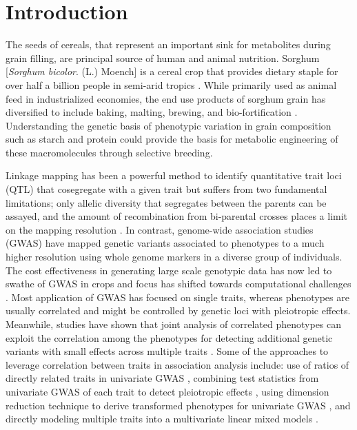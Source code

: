 \documentclass[10pt,letterpaper]{article}
\begin{document}
\section*{Introduction}
The seeds of cereals, that represent an important sink for metabolites during grain filling, are principal source of human and animal nutrition. Sorghum [\textit{Sorghum bicolor}. (L.) Moench] is a cereal crop that provides dietary staple for over half a billion people in semi-arid tropics \parencite{mace2013whole}. While primarily used as animal feed in industrialized economies, the end use products of sorghum grain has diversified to include baking, malting, brewing, and bio-fortification \parencite{zhu2014structure}. Understanding the genetic basis of phenotypic variation in grain composition such as starch and protein could provide the basis for metabolic engineering of these macromolecules through selective breeding.

Linkage mapping has been a powerful method to identify quantitative trait loci (QTL) that cosegregate with a given trait but suffers from two fundamental limitations; only allelic diversity that segregates between the parents can be assayed, and the amount of recombination from bi-parental crosses places a limit on the mapping resolution \parencite{korte2013advantages}. In contrast, genome-wide association studies (GWAS) have mapped genetic variants associated to phenotypes to a much higher resolution using whole genome markers in a diverse group of individuals. The cost effectiveness in generating large scale genotypic data has now led to swathe of GWAS in crops and focus has shifted towards computational challenges \parencite{myles2009association}. Most application of GWAS has focused on single traits, whereas phenotypes are usually correlated and might be controlled by genetic loci with pleiotropic effects. Meanwhile, studies have shown that joint analysis of correlated phenotypes can exploit the correlation among the phenotypes for detecting additional genetic variants with small effects across multiple traits \parencite{korte2012mixed,thoen2017genetic,carlson2019multivariate,rice2020multi}. Some of the approaches to leverage correlation between traits in association analysis include: use of ratios of directly related traits in univariate GWAS \parencite{gieger2008genetics}, combining test statistics from univariate GWAS of each trait to detect pleiotropic effects \parencite{yang2010analyze}, using dimension reduction technique to derive transformed phenotypes for univariate GWAS \parencite{aschard2014maximizing}, and directly modeling multiple traits into a multivariate linear mixed models \parencite{korte2012mixed,zhou2014efficient}.
\end{document}
